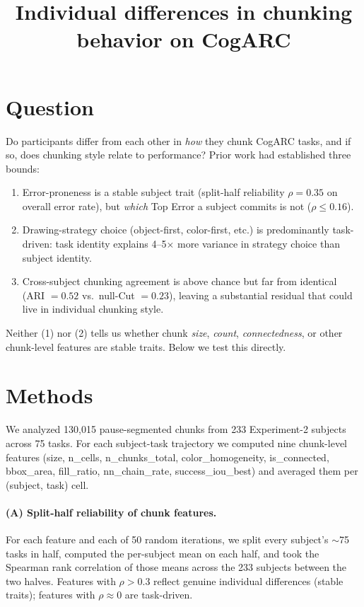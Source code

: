 \documentclass[11pt]{article}
\title{Individual differences in chunking behavior on CogARC}
\author{}
\date{}
\begin{document}
\maketitle

\section*{Question}

Do participants differ from each other in \emph{how} they chunk CogARC
tasks, and if so, does chunking style relate to performance? Prior
work had established three bounds:

\begin{enumerate}
  \item Error-proneness is a stable subject trait (split-half
    reliability $\rho = 0.35$ on overall error rate), but \emph{which}
    Top Error a subject commits is not ($\rho \leq 0.16$).
  \item Drawing-strategy choice (object-first, color-first, etc.) is
    predominantly task-driven: task identity explains 4--5$\times$ more
    variance in strategy choice than subject identity.
  \item Cross-subject chunking agreement is above chance but far from
    identical (ARI $=0.52$ vs.\ null-Cut $=0.23$), leaving a substantial
    residual that could live in individual chunking style.
\end{enumerate}

Neither (1) nor (2) tells us whether chunk \emph{size}, \emph{count},
\emph{connectedness}, or other chunk-level features are stable traits.
Below we test this directly.

\section*{Methods}

We analyzed 130{,}015 pause-segmented chunks from 233 Experiment-2
subjects across 75 tasks. For each subject-task trajectory we
computed nine chunk-level features (size, n\_cells, n\_chunks\_total,
color\_homogeneity, is\_connected, bbox\_area, fill\_ratio,
nn\_chain\_rate, success\_iou\_best) and averaged them per
(subject, task) cell.

\paragraph{(A) Split-half reliability of chunk features.} For each
feature and each of 50 random iterations, we split every subject's
$\sim$75 tasks in half, computed the per-subject mean on each half, and
took the Spearman rank correlation of those means across the 233
subjects between the two halves. Features with $\rho > 0.3$ reflect
genuine individual differences (stable traits); features with $\rho
\approx 0$ are task-driven.
\end{document}
